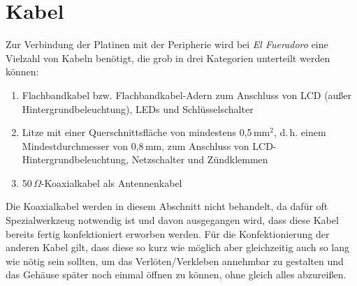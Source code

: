 \documentclass[pdftex, parskip, numbers=noenddot, toc=listof]{scrbook}
\newcommand{\anlage}{\emph{El Fueradoro}}
\begin{document}
		\section{Kabel}

			Zur Verbindung der Platinen mit der Peripherie wird bei {\anlage} eine Vielzahl von Kabeln benötigt, die grob in drei Kategorien unterteilt werden können:
			\begin{enumerate}
				\item  Flachbandkabel bzw. Flachbandkabel-Adern zum Anschluss von LCD (außer Hintergrundbeleuchtung), LEDs und Schlüsselschalter
				\item Litze mit einer Querschnittsfläche von mindestens 0,5\,mm$^2$, d.\,h. einem Mindestdurchmesser von 0,8\,mm, zum Anschluss von LCD-Hintergrundbeleuchtung, Netzschalter und
				      Zündklemmen
				\item 50\,$\Omega$-Koaxialkabel als Antennenkabel
			\end{enumerate}

			Die Koaxialkabel werden in diesem Abschnitt nicht behandelt, da dafür oft Spezialwerkzeug notwendig ist und davon ausgegangen wird, dass diese Kabel bereits fertig konfektioniert erworben werden. Für die Konfektionierung der anderen Kabel gilt, dass diese so kurz wie möglich aber gleichzeitig auch so lang wie nötig sein sollten, um das Verlöten/Verkleben annehmbar zu gestalten und das Gehäuse später noch einmal öffnen zu können, ohne gleich alles abzureißen.
\end{document}
